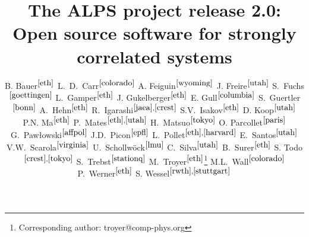 \documentclass[12pt]{iopart}
\begin{document}
\lstset{language=Python,basicstyle=\scriptsize,numbers=left,stepnumber=5,numberfirstline=true}

\title{The ALPS project release 2.0: \\ Open source software for strongly correlated systems}


\newcommand{\myauthor}[3]{#2$^{#1}$}
\newcommand{\myaddress}[2]{\address{\refstepcounter{affiliation} $^{\arabic{affiliation}}$#2 \label{#1}}}

\author{
	\myauthor{\ref{eth}}{B. Bauer}{bauerb@phys.ethz.ch}
	\myauthor{\ref{colorado}}{L.~D.~Carr}{lcarr@mines.edu}
	\myauthor{\ref{wyoming}}{A. Feiguin}{afeiguin@uwyo.edu}
	\myauthor{\ref{utah}}{J. Freire}{juliana@cs.utah.edu}
	\myauthor{\ref{goettingen}}{S.~Fuchs}{fuchs@theorie.physik.uni-goettingen.de}
	\myauthor{\ref{eth}}{L.~Gamper}{gamperl@gmail.com}
	\myauthor{\ref{eth}}{J. Gukelberger}{gukelberger@phys.ethz.ch}
	\myauthor{\ref{columbia}}{E. Gull}{gull@phys.columbia.edu}
	\myauthor{\ref{bonn}}{S.~Guertler}{guertler@th.physik.uni-bonn.de}
	\myauthor{\ref{eth}}{A.~Hehn}{hehn@phys.ethz.ch}
	\myauthor{\ref{jaea},\ref{crest}}{R.~Igarashi}{rigarash@hosi.phys.s.u-tokyo.ac.jp}
	\myauthor{\ref{eth}}{S.V.~Isakov}{isakov@phys.ethz.ch}
	\myauthor{\ref{utah}}{D. Koop}{dakoop@cs.utah.edu}
	\myauthor{\ref{eth}}{P.N. Ma}{pingnang@phys.ethz.ch}
	\myauthor{\ref{eth},\ref{utah}}{P.~Mates}{mates@sci.utah.edu}
	\myauthor{\ref{tokyo}}{H.~Matsuo}{halm@looper.t.u-tokyo.ac.jp}
	\myauthor{\ref{paris}}{O. Parcollet}{parcolle@spht.saclay.cea.fr}
	\myauthor{\ref{affpol}}{G.~Paw{\l}owski}{gpawlo@amu.edu.pl}
	\myauthor{\ref{epfl}}{J.D.~Picon}{jean-david.picon@epfl.chl}
	\myauthor{\ref{eth},\ref{harvard}}{L.~Pollet}{pollet@phys.ethz.ch}
	\myauthor{\ref{utah}}{E.~Santos}{emanuele@sci.utah.edu}
	\myauthor{\ref{virginia}}{V.W.~Scarola}{scarola@vt.edu}
	\myauthor{\ref{lmu}}{U.~Schollw\"ock}{schollwoeck@lmu.de}
	\myauthor{\ref{utah}}{C.~Silva}{csilva@sci.utah.edu}
	\myauthor{\ref{eth}}{B.~Surer}{surerb@phys.ethz.ch}
	\myauthor{\ref{crest},\ref{tokyo}}{S. Todo}{wistaria@ap.t.u-tokyo.ac.jp}
	\myauthor{\ref{stationq}}{S.~Trebst}{trebst@kitp.ucsb.edu}
	\myauthor{\ref{eth}}{M.~Troyer}{troyer@ethz.ch}\footnote{Corresponding author: troyer@comp-phys.org}
	\myauthor{\ref{colorado}}{M.L.~Wall}{mwall@mymail.mines.edu}
	\myauthor{\ref{eth}}{P.~Werner}{werner@phys.ethz.ch}
	\myauthor{\ref{rwth},\ref{stuttgart}}{S. Wessel}{wessel@phys.ethz.ch}
}

\end{document}
